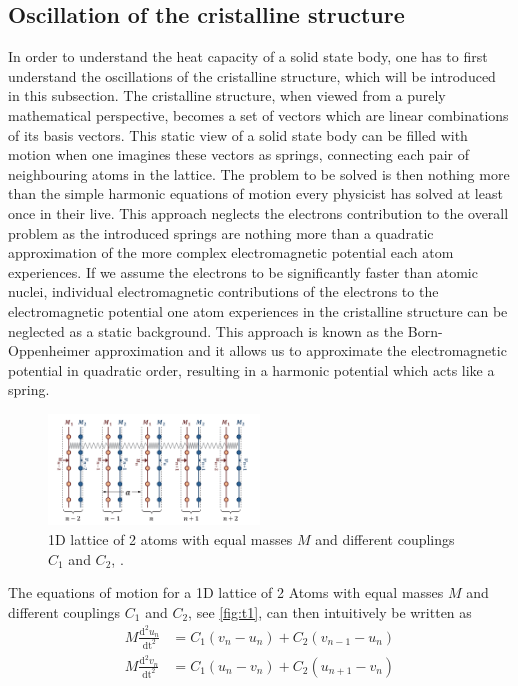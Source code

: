 \subsection{Oscillation of the cristalline structure}
In order to understand the heat capacity of a solid state body, one has to first understand the oscillations of the cristalline structure, which will be introduced in this subsection.
The cristalline structure, when viewed from a purely mathematical perspective, becomes a set of vectors which are linear combinations of its basis vectors. This static view of a solid state body can be filled with motion when one imagines these vectors as springs, connecting each pair of neighbouring atoms in the lattice. The problem to be solved is then nothing more than the simple harmonic equations of motion every physicist has solved at least once in their live.
This approach neglects the electrons contribution to the overall problem as the introduced springs are nothing more than a quadratic approximation of the more complex electromagnetic potential each atom experiences. If we assume the electrons to be significantly faster than atomic nuclei, individual electromagnetic contributions of the electrons to the electromagnetic potential one atom experiences in the cristalline structure can be neglected as a static background.
This approach is known as the Born-Oppenheimer approximation and it allows us to approximate the electromagnetic potential in quadratic order, resulting in a harmonic potential which acts like a spring.
\begin{figure}[H]
    \centering
    \includegraphics[width=0.5\textwidth]{lattice.pdf}
    \caption{1D lattice of 2 atoms with equal masses $M$ and different couplings $C_1$ and $C_2$, \cite{rehab}.}
    \label{fig:t1}
\end{figure}
\noindent
The equations of motion for a 1D lattice of 2 Atoms with equal masses $M$ and different couplings $C_1$ and $C_2$, see \autoref{fig:t1}, can then intuitively be written as 
\begin{align}
    M \frac{\text{d}^2 u_n}{\text{dt}^2} &= C_1 \left( v_n - u_n \right) + C_2 \left( v_{n-1} - u_n \right) \\
    M \frac{\text{d}^2 v_n}{\text{dt}^2} &= C_1 \left( u_n - v_n \right) + C_2 \left( u_{n+1} - v_n \right)
\end{align}
